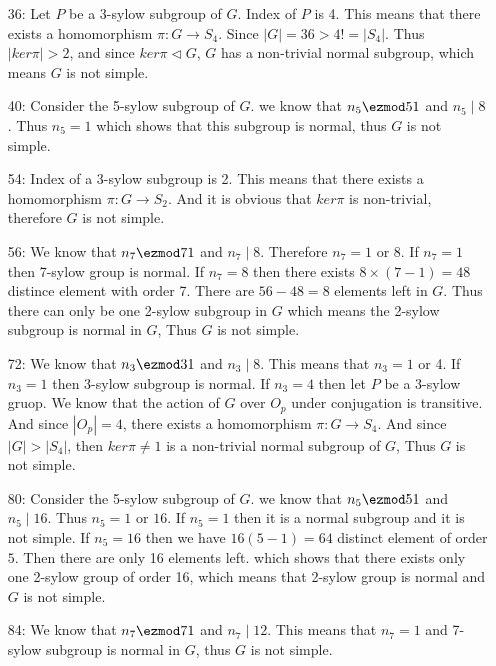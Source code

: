 \begin{enumerate}[label=]
\begin{itemize}
            \item[36:] Let $P$ be a 3-sylow subgroup of $G$. Index of $P$ is 4. This means that there exists a homomorphism $\pi: G \to S_4$. Since $|G| = 36 > 4! = |S_4|$. Thus $|ker \pi| > 2$, and since $ker \pi \vartriangleleft G$, $G$ has a non-trivial normal subgroup, which means $G$ is not simple.
            
            \item[40:] Consider the 5-sylow subgroup of $G$. we know that $n_5 \ezmod 5 1$ and $n_5 \mid 8$. Thus $n_5 = 1$ which shows that this subgroup is normal, thus $G$ is not simple.
            
            \item[54:] Index of a 3-sylow subgroup is 2. This means that there exists a homomorphism $\pi: G \to S_2$. And it is obvious that $ker\pi$ is non-trivial, therefore $G$ is not simple.
            
            \item[56:] We know that $n_7 \ezmod 7 1$ and $n_7 \mid 8$. Therefore $n_7 = 1$ or 8. If $n_7 = 1$ then 7-sylow group is normal. If $n_7 = 8$ then there exists $8 \times (7 - 1) = 48$ distince element with order 7. There are $56 - 48 = 8$ elements left in $G$. Thus there can only be one 2-sylow subgroup in $G$ which means the 2-sylow subgroup is normal in $G$, Thus $G$ is not simple.
            
            \item[72:] We know that $n_3 \ezmod 3 1$ and $n_3 \mid 8$. This means that $n_3 = 1$ or 4. If $n_3 = 1$ then 3-sylow subgroup is normal. If $n_3 = 4$ then let $P$ be a 3-sylow gruop. We know that the action of $G$ over $O_p$ under conjugation is transitive. And since $|O_p| = 4$, there exists a homomorphism $\pi: G \to S_4$. And since $|G| > |S_4|$, then $ker\pi \ne {1}$ is a non-trivial normal subgroup of $G$, Thus $G$ is not simple.
            
            \item[80:] Consider the 5-sylow subgroup of $G$. we know that $n_5 \ezmod 5 1$ and $n_5 \mid 16$. Thus $n_5 = 1$ or $16$.
            If $n_5 = 1$ then it is a normal subgroup and it is not simple.
            If $n_5 = 16$ then we have $16 (5 - 1) = 64$ distinct element of order $5$. Then there are only 16 elements left. which shows that there exists only one 2-sylow group of order 16, which means that 2-sylow group is normal and $G$ is not simple.
            
            \item[84:] We know that $n_7 \ezmod 7 1$ and $n_7 \mid 12$. This means that $n_7 = 1$ and 7-sylow subgroup is normal in $G$, thus $G$ is not simple.
            

\end{itemize}
\end{enumerate}
